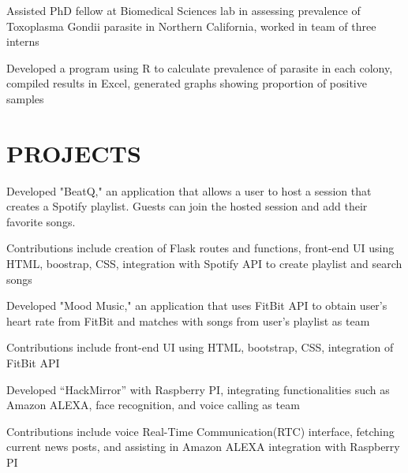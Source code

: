 \documentclass[]{deedy-resume-openfont}
\begin{document}
\begin{minipage}[t]{0.67\textwidth}
\begin{tightemize}
\item Assisted PhD fellow at Biomedical Sciences lab in assessing prevalence of Toxoplasma Gondii parasite in Northern California, worked in team of three interns
\item Developed a program using R to calculate prevalence of parasite in each colony, compiled results in Excel, generated graphs showing proportion of positive samples
\end{tightemize}
\sectionsep


\section {PROJECTS}

\begin{tightemize}
\item Developed "BeatQ," an application that allows a user to host a session that  creates a Spotify playlist. Guests can join the hosted session and add their favorite songs.
\item Contributions include creation of Flask routes and functions, front-end UI using HTML, boostrap, CSS, integration with Spotify API to create playlist and search songs
\end{tightemize}
\sectionsep

\descript{}
\begin{tightemize}
\item Developed "Mood Music," an application that uses FitBit API to obtain user's heart rate from FitBit and matches with songs from user's playlist as team
\item Contributions include front-end UI using HTML, bootstrap, CSS, integration of FitBit API
\end{tightemize}
\sectionsep

\begin{tightemize}
\item Developed “HackMirror” with Raspberry PI, integrating functionalities such as Amazon ALEXA, face recognition, and voice calling as team
\item Contributions include voice Real-Time Communication(RTC) interface, fetching current news posts, and assisting in Amazon ALEXA integration with Raspberry PI
\end{tightemize}
\sectionsep

\end{minipage} 
\end{document}
